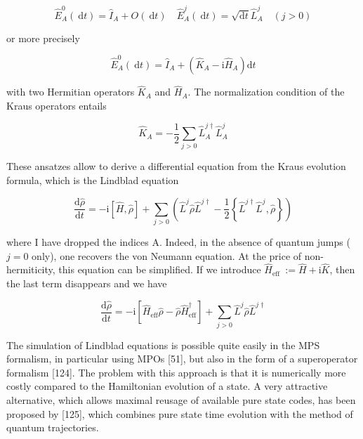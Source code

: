\documentclass[12pt]{article}
\begin{document}
\begin{equation*}
\hat{E}_{A}^{0}(\mathrm{~d} t)=\hat{I}_{A}+O(\mathrm{~d} t) \quad \hat{E}_{A}^{j}(\mathrm{~d} t)=\sqrt{\mathrm{d} t} \hat{L}_{A}^{j} \quad(j>0) \tag{312}
\end{equation*}


or more precisely


\begin{equation*}
\hat{E}_{A}^{0}(\mathrm{~d} t)=\hat{I}_{A}+\left(\hat{K}_{A}-\mathrm{i} \hat{H}_{A}\right) \mathrm{d} t \tag{313}
\end{equation*}


with two Hermitian operators $\hat{K}_{A}$ and $\hat{H}_{A}$. The normalization condition of the Kraus operators entails


\begin{equation*}
\hat{K}_{A}=-\frac{1}{2} \sum_{j>0} \hat{L}_{A}^{j \dagger} \hat{L}_{A}^{j} \tag{314}
\end{equation*}


These ansatzes allow to derive a differential equation from the Kraus evolution formula, which is the Lindblad equation


\begin{equation*}
\frac{\mathrm{d} \hat{\rho}}{\mathrm{d} t}=-\mathrm{i}[\hat{H}, \hat{\rho}]+\sum_{j>0}\left(\hat{L}^{j} \hat{\rho} \hat{L}^{j \dagger}-\frac{1}{2}\left\{\hat{L}^{j \dagger} \hat{L}^{j}, \hat{\rho}\right\}\right) \tag{315}
\end{equation*}


where I have dropped the indices A. Indeed, in the absence of quantum jumps ( $j=0$ only), one recovers the von Neumann equation. At the price of non-hermiticity, this equation can be simplified. If we introduce $\hat{H}_{\text {eff }}:=\hat{H}+\mathrm{i} \hat{K}$, then the last term disappears and we have


\begin{equation*}
\frac{\mathrm{d} \hat{\rho}}{\mathrm{d} t}=-\mathrm{i}\left[\hat{H}_{\mathrm{eff}} \hat{\rho}-\hat{\rho} \hat{H}_{\mathrm{eff}}^{\dagger}\right]+\sum_{j>0} \hat{L}^{j} \hat{\rho} \hat{L}^{j \dagger} \tag{316}
\end{equation*}


The simulation of Lindblad equations is possible quite easily in the MPS formalism, in particular using MPOs [51], but also in the form of a superoperator formalism [124]. The problem with this approach is that it is numerically more costly compared to the Hamiltonian evolution of a state. A very attractive alternative, which allows maximal reusage of available pure state codes, has been proposed by [125], which combines pure state time evolution with the method of quantum trajectories.
\end{document}
